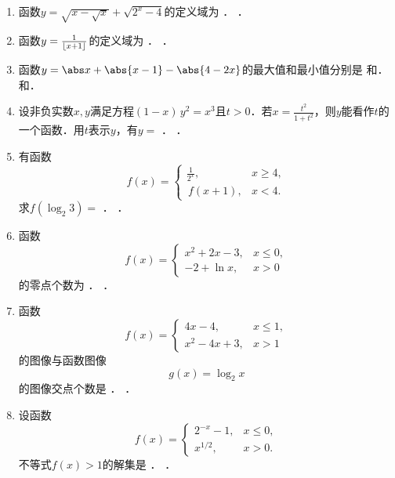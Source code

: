 \begin{enumerate}
\item 函数\(y = \sqrt{x - \sqrt{x}} + \sqrt{2^x - 4}\)的定义域为
  \ifshowsol
  \uline{}．
  \else
  \uline{\makebox[5em]{}}．
  \fi

\item 函数\(y = \frac1{\lfloor x+1\rfloor}\)的定义域为
  \ifshowsol
  \uline{}．
  \else
  \uline{\makebox[10em]{}}．
  \fi

\item 函数\(y = \abs x + \abs{x-1} - \abs{4-2x}\)的最大值和最小值分别是
  \ifshowsol
    \uline{}和\uline{}．
  \else
  \uline{\makebox[3em]{}}和\uline{\makebox[3em]{}}．
  \fi

\item 设非负实数\(x, y\)满足方程\((1-x)\,y^2 = x^3\)且\(t > 0\)．若\(x = \frac{t^2}{1+t^2}\)，则\(y\)能看作\(t\)的一个函数．用\(t\)表示\(y\)，有\(y =\)
  \ifshowsol
  \uline{}．
  \else
  \uline{\makebox[6em]{}}．
  \fi

\item 有函数
  \[
    f(x) =
    \begin{cases}
      \frac1{2^x}, & x \ge 4, \\
      \,f(x+1), & x < 4.
    \end{cases}
  \]
  求\(f(\log_2 3) =\)
  \ifshowsol
  \uline{}．
  \else
  \uline{\makebox[4em]{}}．
  \fi

\item 函数
  \[
    f(x) =
    \begin{cases}
      x^2 + 2x - 3, & x \le 0, \\
      -2 + \ln x, & x > 0
    \end{cases}
  \]
  的零点个数为
  \ifshowsol
  \uline{}．
  \else
  \uline{\makebox[3em]{}}．
  \fi

\item 函数
  \[
    f(x) =
    \begin{cases}
      4x - 4, & x \le 1, \\
      x^2 - 4x + 3, & x > 1
    \end{cases}
  \]
  的图像与函数图像
  \[
    g(x) = \log_2 x
  \]
  的图像交点个数是
  \ifshowsol
  \uline{}．
  \else
  \uline{\makebox[3em]{}}．
  \fi

\item 设函数
  \[
    f(x) =
    \begin{cases}
      2^{-x} - 1, & x \le 0, \\
      x^{1/2}, & x > 0.
    \end{cases}
  \]
  不等式\(f(x) > 1\)的解集是
  \ifshowsol
  \uline{}．
  \else
  \uline{\makebox[10em]{}}．
  \fi


\end{enumerate}
